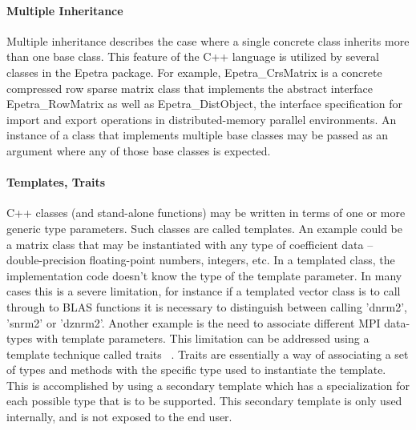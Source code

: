 \documentclass[12pt,relax]{SANDreport}
\begin{document}
\paragraph{Multiple Inheritance}
Multiple inheritance describes the case where a single concrete class inherits
more than one base class. This feature of the C++ language is utilized by
several classes in the Epetra package. For example, Epetra\_CrsMatrix is a
concrete compressed row sparse matrix class that implements the abstract
interface Epetra\_RowMatrix as well as Epetra\_DistObject, the interface
specification for import and export operations in distributed-memory parallel
environments. An instance of a class that implements multiple base classes may
be passed as an argument where any of those base classes is expected.

\paragraph{Templates, Traits}
C++ classes (and stand-alone functions) may be written in terms of one or more
generic type parameters. Such classes are called templates. An example could be
a matrix class that may be instantiated with any type of coefficient data --
double-precision floating-point numbers, integers, etc. In a templated class,
the implementation code doesn't know the type of the template parameter. In
many cases this is a severe limitation, for instance if a templated vector
class is to call through to BLAS functions it is necessary to distinguish
between calling 'dnrm2', 'snrm2' or 'dznrm2'. Another example is the need to
associate different MPI data-types with template parameters. This limitation
can be addressed using a template technique called traits ~\cite{MyersTraits}.
Traits are essentially a way of associating a set of types and methods with
the specific type used to instantiate the template. This is accomplished by
using a secondary template which has a specialization for each possible type
that is to be supported. This secondary template is only used internally, and
is not exposed to the end user.

\end{document}
